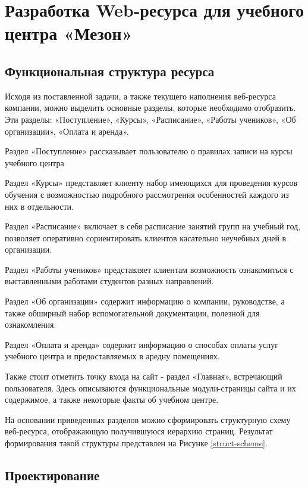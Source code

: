 \section{Разработка Web-ресурса для учебного центра «Мезон»}


\subsection{Функциональная структура ресурса}




Исходя из поставленной задачи, а также текущего наполнения веб-ресурса компании, можно выделить основные разделы, которые необходимо отобразить.
Эти разделы: «Поступление», «Курсы», «Расписание», «Работы учеников», «Об организации», «Оплата и аренда».

Раздел «Поступление» рассказывает пользователю о правилах записи на курсы учебного центра

Раздел «Курсы» представляет клиенту набор имеющихся для проведения курсов обучения с возможностью подробного рассмотрения особенностей каждого из них в отдельности.

Раздел «Расписание» включает в себя расписание занятий групп на учебный год, позволяет оперативно сориентировать клиентов касательно неучебных дней в организации.

Раздел «Работы учеников» представляет клиентам возможность ознакомиться с выставленными работами студентов разных направлений.

Раздел «Об организации» содержит информацию о компании, руководстве, а также обширный набор вспомогательной документации, полезной для ознакомления.

Раздел «Оплата и аренда» содержит информацию о способах оплаты услуг учебного центра и предоставляемых в аредну помещениях.

Также стоит отметить точку входа на сайт - раздел «Главная», встречающий пользователя.
Здесь описываются функциональные модули-страницы сайта и их содержимое, а также некоторые факты об учебном центре.

На основании приведенных разделов можно сформировать структурную схему веб-ресурса, отображающую получившуюся иерархию страниц.
Результат формирования такой структуры представлен на Рисунке \ref{struct-scheme}.



\subsection{Проектирование }



\clearpage
